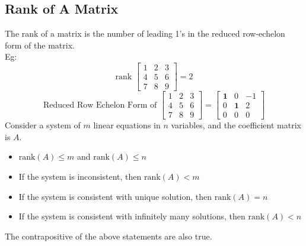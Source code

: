 \documentclass{article}
\begin{document}
\subsection{Rank of A Matrix}
The rank of a matrix is the number of leading 1's in the reduced row-echelon form of the matrix.\\
Eg: $$\text{rank } \begin{bmatrix}
    1 & 2 & 3 \\
    4 & 5 & 6 \\
    7 & 8 & 9
    \end{bmatrix} = 2$$
    $$\text{Reduced Row Echelon Form of } \begin{bmatrix}
        1 & 2 & 3 \\
        4 & 5 & 6 \\
        7 & 8 & 9
        \end{bmatrix} = \begin{bmatrix}
            \textbf{1} & 0 & -1 \\
            0 & \textbf{1} & 2 \\
            0 & 0 & 0
        \end{bmatrix}$$
Consider a system of $m$ linear equations in $n$ variables, and the coefficient matrix is $A$.
        \begin{itemize}
    \item $\text{rank}(A) \le m$ and $\text{rank}(A) \le n$
    \item If the system is inconsistent, then $\text{rank}(A) < m$
    \item If the system is consistent with unique solution, then $\text{rank}(A) = n$
    \item If the system is consistent with infinitely many solutions, then $\text{rank}(A) < n$
\end{itemize}

The contrapositive of the above statements are also true.
\end{document}
